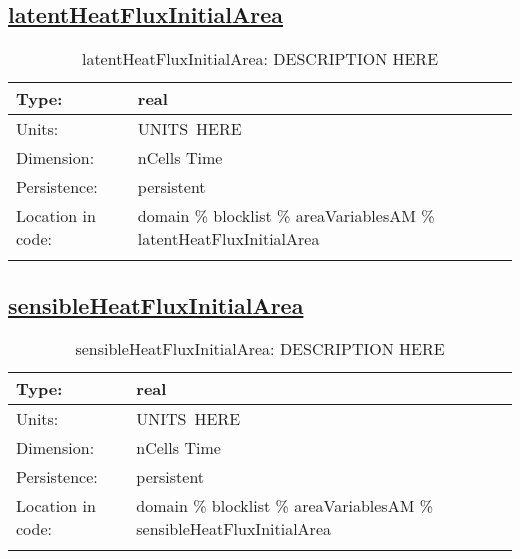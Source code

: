 \subsection[latentHeatFluxInitialArea]{\hyperref[sec:var_tab_areaVariablesAM]{latentHeatFluxInitialArea}}
\label{subsec:var_sec_areaVariablesAM_latentHeatFluxInitialArea}
\begin{center}
\begin{longtable}{| p{2.0in} | p{4.0in} |}
        \hline 
        Type: & real \\
        \hline 
        Units: & \si{UNITS.HERE} \\
        \hline 
        Dimension: & nCells Time \\
        \hline 
        Persistence: & persistent \\
        \hline 
         Location in code: & domain \% blocklist \% areaVariablesAM \% latentHeatFluxInitialArea \\
         \hline 
    \caption{latentHeatFluxInitialArea: DESCRIPTION HERE}
\end{longtable}
\end{center}
\subsection[sensibleHeatFluxInitialArea]{\hyperref[sec:var_tab_areaVariablesAM]{sensibleHeatFluxInitialArea}}
\label{subsec:var_sec_areaVariablesAM_sensibleHeatFluxInitialArea}
\begin{center}
\begin{longtable}{| p{2.0in} | p{4.0in} |}
        \hline 
        Type: & real \\
        \hline 
        Units: & \si{UNITS.HERE} \\
        \hline 
        Dimension: & nCells Time \\
        \hline 
        Persistence: & persistent \\
        \hline 
         Location in code: & domain \% blocklist \% areaVariablesAM \% sensibleHeatFluxInitialArea \\
         \hline 
    \caption{sensibleHeatFluxInitialArea: DESCRIPTION HERE}
\end{longtable}
\end{center}
